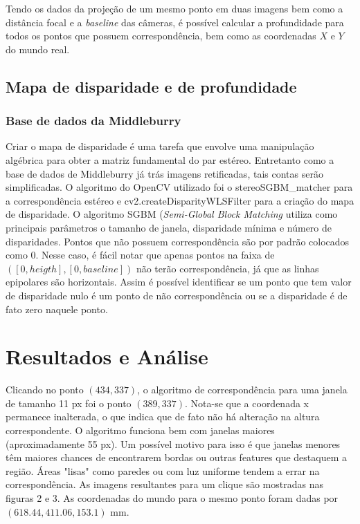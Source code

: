 \documentclass{bmvc2k}
\begin{document}
Tendo os dados da proje\c{c}ão de um mesmo ponto em duas imagens bem como a distância focal e a \textit{baseline} das câmeras, é possível calcular a profundidade para todos os pontos que possuem correspondência, bem como as coordenadas $X$ e $Y$ do mundo real. 

\subsection{Mapa de disparidade e de profundidade}

\subsubsection{Base de dados da Middleburry}

Criar o mapa de disparidade é uma tarefa que envolve uma manipulação algébrica para obter
a matriz fundamental do par estéreo.  Entretanto como a base de dados de Middleburry já
trás imagens retificadas, tais contas serão simplificadas.  O algoritmo do OpenCV utilizado
foi o stereoSGBM\_matcher para a correspondência estéreo e cv2.createDisparityWLSFilter para a cria\c{c}ão do mapa de disparidade. O algoritmo SGBM (\textit{Semi-Global Block Matching} utiliza como principais parâmetros o tamanho de janela, disparidade mínima e número de disparidades. Pontos que não possuem correspondência são por padrão colocados como 0. Nesse caso, é fácil notar que apenas pontos na faixa de $([0, heigth],[0, baseline])$ não terão correspondência, já que as linhas epipolares são horizontais. Assim é possível identificar se um ponto que tem valor de disparidade nulo é um ponto de não correspondência ou se a disparidade é de fato zero naquele ponto.


\section{Resultados e Análise}

Clicando no ponto $(434, 337)$, o algoritmo de correspondência para uma janela de tamanho 11 px foi o ponto $(389, 337)$. Nota-se que a coordenada x permanece inalterada, o que indica que de fato não há altera\c{c}ão na altura correspondente. O algoritmo funciona bem com janelas maiores (aproximadamente 55 px). Um possível motivo para isso é que janelas menores têm maiores chances de encontrarem bordas ou outras features que destaquem a região. Áreas "lisas" como paredes ou com luz uniforme tendem a errar na correspondência. As imagens resultantes para um clique são mostradas nas figuras 2 e 3. As coordenadas do mundo para o mesmo ponto foram dadas por $(618.44, 411.06, 153.1)$ mm.
\end{document}
